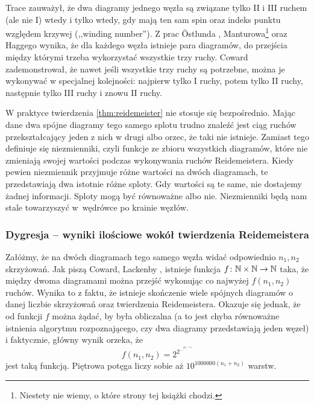 Trace \cite{trace83} zauważył, że dwa diagramy jednego węzła są związane tylko II i III ruchem (ale nie I) wtedy i tylko wtedy, gdy mają ten sam spin oraz indeks punktu względem krzywej (,,winding number'').
%
Z prac Östlunda \cite{ostlund01}, Manturowa\footnote{Niestety nie wiemy, o które strony tej książki chodzi.} \cite{manturov04} oraz Haggego \cite{hagge06} wynika, że dla każdego węzła istnieje para diagramów, do przejścia między którymi trzeba wykorzystać wszystkie trzy ruchy.
%
%
%
Coward \cite{coward06} zademonstrował, że nawet jeśli wszystkie trzy ruchy są potrzebne, można je wykonywać w specjalnej kolejności: najpierw tylko I ruchy, potem tylko II ruchy, następnie tylko III ruchy i znowu II ruchy.
%

W praktyce twierdzenia \ref{thm:reidemeister} nie stosuje się bezpośrednio.
Mając dane dwa spójne diagramy tego samego splotu trudno znaleźć jest ciąg ruchów przekształcający jeden z nich w drugi albo orzec, że taki nie istnieje.
Zamiast tego definiuje się niezmienniki, czyli funkcje ze zbioru wszystkich diagramów, które nie zmieniają swojej wartości podczas wykonywania ruchów Reidemeistera.
Kiedy pewien niezmiennik przyjmuje różne wartości na dwóch diagramach, te przedstawiają dwa istotnie różne sploty.
Gdy wartości są te same, nie dostajemy żadnej informacji.
Sploty mogą być równoważne albo nie.
Niezmienniki będą nam stale towarzyszyć w~wędrówce po krainie węzłów.

\subsubsection{Dygresja -- wyniki ilościowe wokół twierdzenia Reidemeistera}
Załóżmy, że na dwóch diagramach tego samego węzła widać odpowiednio $n_1, n_2$ skrzyżowań.
Jak piszą Coward, Lackenby \cite{coward11}, istnieje funkcja $f \colon \mathbb N \times \mathbb N \to \mathbb N$ taka, że między dwoma diagramami można przejść wykonując co najwyżej $f(n_1, n_2)$ ruchów.
%
%
Wynika to z faktu, że istnieje skończenie wiele spójnych diagramów o danej liczbie skrzyżowań oraz twierdzenia Reidemeistera.
Okazuje się jednak, że od funkcji $f$ można żądać, by była obliczalna
(a to jest chyba równoważne istnienia algorytmu rozpoznającego, czy dwa diagramy przedstawiają jeden węzeł)
i faktycznie, główny wynik \cite{coward11} orzeka, że
\begin{equation}
    f(n_1, n_2) = 2^{2^{\ldots^{2^{n_1 + n_2}}}}
\end{equation}
jest taką funkcją.
Piętrowa potęga liczy sobie aż $10^{1000000 (n_1 + n_2)}$ warstw.

